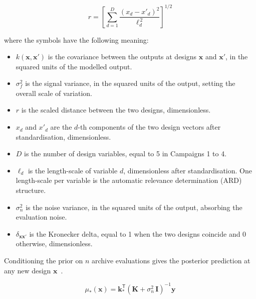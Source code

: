 \begin{equation}
r = \left[ \sum_{d=1}^{D}
\frac{(x_d - x'_d)^{2}}{\ell_d^{\,2}} \right]^{1/2}
\label{eq:kernel-r}
\end{equation}

\noindent where the symbols have the following meaning:

\begin{itemize}
  \item $k(\mathbf{x}, \mathbf{x}')$ is the covariance between the
        outputs at designs $\mathbf{x}$ and $\mathbf{x}'$, in the
        squared units of the modelled output.

  \item $\sigma_f^{2}$ is the signal variance, in the squared units of
        the output, setting the overall scale of variation.

  \item $r$ is the scaled distance between the two designs,
        dimensionless.

  \item $x_d$ and $x'_d$ are the $d$-th components of the two design
        vectors after standardisation, dimensionless.

  \item $D$ is the number of design variables, equal to 5 in Campaigns
        1 to 4.

  \item $\ell_d$ is the length-scale of variable $d$, dimensionless
        after standardisation. One length-scale per variable is the
        automatic relevance determination (ARD) structure.

  \item $\sigma_n^{2}$ is the noise variance, in the squared units of
        the output, absorbing the evaluation noise.

  \item $\delta_{\mathbf{x}\mathbf{x}'}$ is the Kronecker delta, equal
        to 1 when the two designs coincide and 0 otherwise,
        dimensionless.
\end{itemize}

Conditioning the prior on $n$ archive evaluations gives the posterior
prediction at any new design $\mathbf{x}$~\cite{rasmussen_gp_2006}.

\begin{equation}
\mu_*(\mathbf{x})
= \mathbf{k}_*^{\mathsf T}
\left( \mathbf{K} + \sigma_n^{2}\,\mathbf{I} \right)^{-1} \mathbf{y}
\label{eq:gp-mean}
\end{equation}

